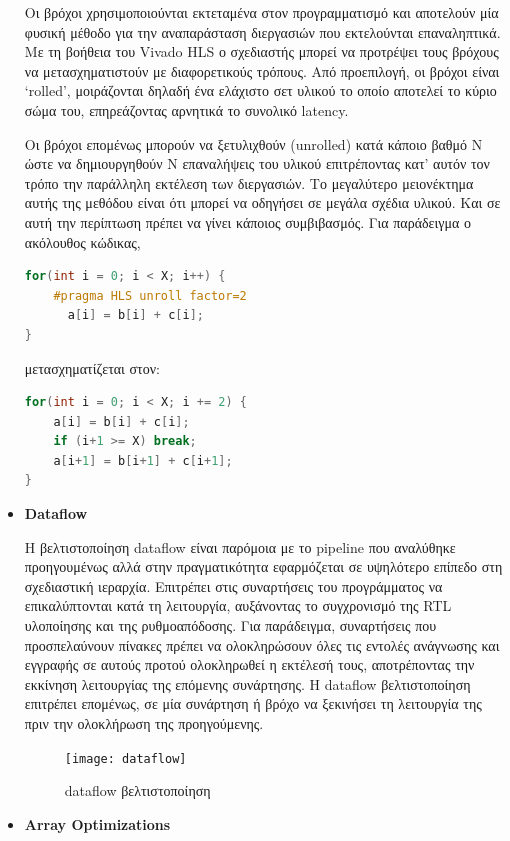 \begin{itemize}[label={},leftmargin=*]
Οι βρόχοι χρησιμοποιούνται εκτεταμένα στον προγραμματισμό και αποτελούν μία φυσική μέθοδο για την αναπαράσταση διεργασιών που εκτελούνται επαναληπτικά. Με τη βοήθεια του Vivado HLS ο σχεδιαστής μπορεί να προτρέψει τους βρόχους να μετασχηματιστούν με διαφορετικούς τρόπους. Από προεπιλογή, οι βρόχοι είναι `rolled', μοιράζονται δηλαδή ένα ελάχιστο σετ υλικού το οποίο αποτελεί το κύριο σώμα του, επηρεάζοντας αρνητικά το συνολικό latency.

Οι βρόχοι επομένως μπορούν να ξετυλιχθούν (unrolled) κατά κάποιο βαθμό N ώστε να δημιουργηθούν N επαναλήψεις του υλικού επιτρέποντας κατ' αυτόν τον τρόπο την παράλληλη εκτέλεση των διεργασιών. Το μεγαλύτερο μειονέκτημα αυτής της μεθόδου είναι ότι μπορεί να οδηγήσει σε μεγάλα σχέδια υλικού. Και σε αυτή την περίπτωση πρέπει να γίνει κάποιος συμβιβασμός.
\noindent Για παράδειγμα ο ακόλουθος κώδικας,
\begin{lstlisting}[language=C++,belowskip=-1.2 \baselineskip]
for(int i = 0; i < X; i++) {
	#pragma HLS unroll factor=2
	  a[i] = b[i] + c[i];
}
\end{lstlisting}
\noindent μετασχηματίζεται στον:
\begin{lstlisting}[language=C++,belowskip=-1.2 \baselineskip]
for(int i = 0; i < X; i += 2) {
  	a[i] = b[i] + c[i];
  	if (i+1 >= X) break;
  	a[i+1] = b[i+1] + c[i+1];
}
\end{lstlisting}
\hfill \break
\item{\textbf{Dataflow}}

Η βελτιστοποίηση dataflow είναι παρόμοια με το pipeline που αναλύθηκε προηγουμένως αλλά στην πραγματικότητα εφαρμόζεται σε υψηλότερο επίπεδο στη σχεδιαστική ιεραρχία. Επιτρέπει στις συναρτήσεις του προγράμματος να επικαλύπτονται κατά τη λειτουργία, αυξάνοντας το συγχρονισμό της RTL υλοποίησης και της ρυθμοαπόδοσης. Για παράδειγμα, συναρτήσεις που προσπελαύνουν πίνακες πρέπει να ολοκληρώσουν όλες τις εντολές ανάγνωσης και εγγραφής σε αυτούς προτού ολοκληρωθεί η εκτέλεσή τους, αποτρέποντας την εκκίνηση λειτουργίας της επόμενης συνάρτησης. Η dataflow βελτιστοποίηση επιτρέπει επομένως, σε μία συνάρτηση ή βρόχο να ξεκινήσει τη λειτουργία της πριν την ολοκλήρωση της προηγούμενης.
\begin{figure}[H]
		\centering
	\texttt{[image: dataflow]}\\
	\caption{dataflow βελτιστοποίηση \cite{HLSPragmas}}
	\label{fig:hlsdflow}
\end{figure}
\item{\textbf{Array Optimizations}}


\end{itemize}
